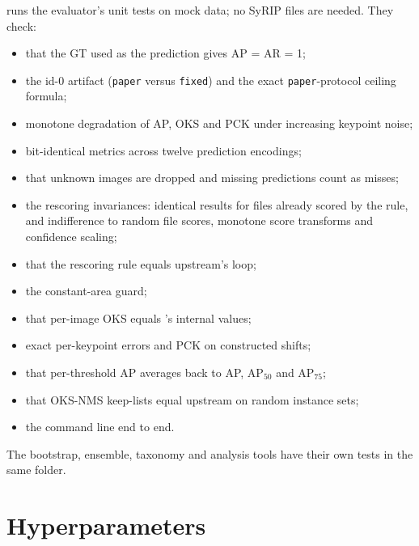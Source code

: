  runs the evaluator's unit tests on mock data; no SyRIP files are needed. They check:
\begin{itemize}[leftmargin=*]
  \item that the GT used as the prediction gives AP = AR = 1;
  \item the id-0 artifact (\texttt{paper} versus \texttt{fixed}) and the exact \texttt{paper}-protocol ceiling formula;
  \item monotone degradation of AP, OKS and PCK under increasing keypoint noise;
  \item bit-identical metrics across twelve prediction encodings;
  \item that unknown images are dropped and missing predictions count as misses;
  \item the rescoring invariances: identical results for files already scored by the rule, and indifference to random file scores, monotone score transforms and confidence scaling;
  \item that the rescoring rule equals upstream's loop;
  \item the constant-area guard;
  \item that per-image OKS equals 's internal values;
  \item exact per-keypoint errors and PCK on constructed shifts;
  \item that per-threshold AP averages back to AP, AP$_{50}$ and AP$_{75}$;
  \item that OKS-NMS keep-lists equal upstream  on random instance sets;
  \item the command line end to end.
\end{itemize}
The bootstrap, ensemble, taxonomy and analysis tools have their own tests in the same folder.

\section{Hyperparameters}\label{app:hparams}

\begin{table}[h]
  \centering\small
  \caption[Resolved training and inference settings]{Resolved training and inference settings. Upstream values come from the released yaml and code at \texttt{a76b4f4}, plus the command-line overrides (, , , , ). MMPose values come from the dumped configs of the selected runs.}
  \label{tab:hparams}
\end{table}

